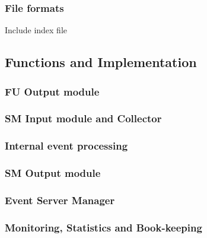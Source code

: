 \subsubsection{File formats}

Include index file

\subsection{Functions and Implementation}

\subsubsection{FU Output module}

\subsubsection{SM Input module and Collector}

\subsubsection{Internal event processing}

\subsubsection{SM Output module}

\subsubsection{Event Server Manager}

\subsubsection{Monitoring, Statistics and Book-keeping}

